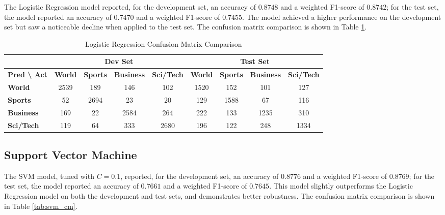 \documentclass[12pt,a4paper,english]{article}
\begin{document}
The Logistic Regression model reported, for the development set, an accuracy of $0.8748$ and a weighted F1-score of $0.8742$; for the test set, the model reported an accuracy of $0.7470$ and a weighted F1-score of $0.7455$. The model achieved a higher performance on the development set but saw a noticeable decline when applied to the test set. The confusion matrix comparison is shown in Table \ref{tab:logreg_cm}.

\begin{table}[h]
    \centering
    \begin{tabular}{|l|cccc|cccc|}
    \hline
         & \multicolumn{4}{c|}{\textbf{Dev Set}} & \multicolumn{4}{c|}{\textbf{Test Set}} \\ \hline
        \textbf{Pred \textbackslash{} Act} & \textbf{World} & \textbf{Sports} & \textbf{Business} & \textbf{Sci/Tech} & \textbf{World} & \textbf{Sports} & \textbf{Business} & \textbf{Sci/Tech} \\ \hline
        \textbf{World} & 2539 & 189 & 146 & 102 & 1520 & 152 & 101 & 127 \\
        \textbf{Sports} & 52 & 2694 & 23 & 20 & 129 & 1588 & 67 & 116 \\
        \textbf{Business} & 169 & 22 & 2584 & 264 & 222 & 133 & 1235 & 310 \\
        \textbf{Sci/Tech} & 119 & 64 & 333 & 2680 & 196 & 122 & 248 & 1334 \\ \hline
    \end{tabular}
    \caption{Logistic Regression Confusion Matrix Comparison}
    \label{tab:logreg_cm}
\end{table}

\subsection{Support Vector Machine}

The SVM model, tuned with $C=0.1$, reported, for the development set, an accuracy of $0.8776$ and a weighted F1-score of $0.8769$; for the test set, the model reported an accuracy of $0.7661$ and a weighted F1-score of $0.7645$. This model slightly outperforms the Logistic Regression model on both the development and test sets, and demonstrates better robustness. The confusion matrix comparison is shown in Table \ref{tab:svm_cm}.
\end{document}
